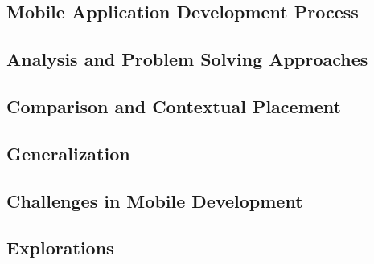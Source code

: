 \documentclass[11pt,english,numbers=endperiod,parskip=half]{scrartcl}
\begin{document}
  \subsection{Mobile Application Development Process}

  \subsection{Analysis and Problem Solving Approaches}

  \subsection{Comparison and Contextual Placement}

  \subsection{Generalization}

  \subsection{Challenges in Mobile Development}

  \subsection{Explorations}
\end{document}
